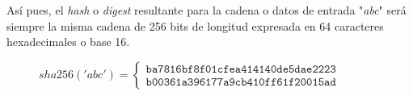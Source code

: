 \documentclass{article}
\begin{document}
    Así pues, el \textit{hash} o \textit{digest} resultante para la cadena o datos de entrada "\textit{abc}" será siempre la misma cadena de 256 bits de longitud expresada en 64 caracteres hexadecimales o base 16.
        \begin{figure}[H]
        \centering
            $sha256('abc') = \left \{
                \begin{array}{c}
                    \texttt{ba7816bf8f01cfea414140de5dae2223} \\
                    \texttt{b00361a396177a9cb410ff61f20015ad}
                \end{array}
                \right .$
        \end{figure}
\end{document}
